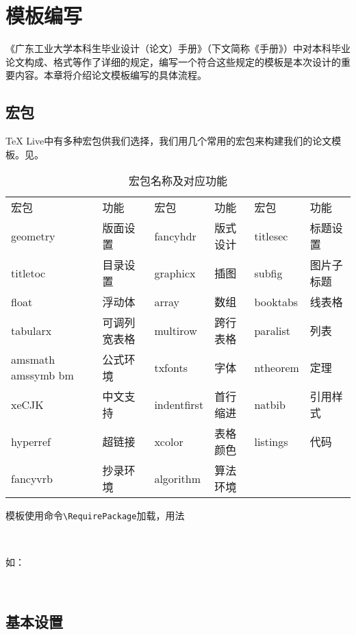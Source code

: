 \chapter{模板编写}
《广东工业大学本科生毕业设计（论文）手册》（下文简称《手册》）中对本科毕业论文构成、格式等作了详细的规定，编写一个符合这些规定的模板是本次设计的重要内容。本章将介绍论文模板编写的具体流程。

\section{宏包}
\TeX{} Live中有多种宏包供我们选择，我们用几个常用的宏包来构建我们的论文模板。见。
\begin{table}[htbp]
\begin{center}
\caption{宏包名称及对应功能}
\label{tab:package}
\begin{tabularx}{\linewidth}{Z|Z|Z|Z|Z|Z} \toprule
宏包 & 功能 & 宏包 & 功能 & 宏包 & 功能 \\
geometry & 版面设置 & fancyhdr &  版式设计 & titlesec & 标题设置\\
titletoc & 目录设置 & graphicx & 插图 & subfig & 图片子标题\\ 
float & 浮动体 & array & 数组 & booktabs & 线表格\\
tabularx & 可调列宽表格 & multirow & 跨行表格 & paralist & 列表\\
amsmath amssymb bm & 公式环境 & txfonts & 字体 & ntheorem & 定理\\
xeCJK & 中文支持 & indentfirst & 首行缩进 & natbib & 引用样式\\
hyperref & 超链接 & xcolor & 表格颜色 & listings & 代码\\
fancyvrb & 抄录环境 & algorithm & 算法环境 & & \\\bottomrule
\end{tabularx}
\end{center}
\end{table}

模板使用命令\verb|\RequirePackage|加载，用法

{\centering {\verb|\RequirePackage[参数1,参数2,参数3......]{宏包}|}\\}

如：

{\\}

\section{基本设置}
